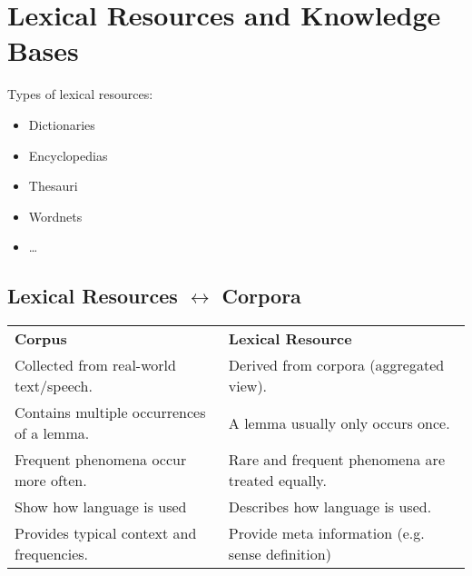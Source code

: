 \documentclass[a4paper, 11pt, accentcolor = tud3b]{tudreport}
\begin{document}
        \section{Lexical Resources and Knowledge Bases} %
        	Types of lexical resources:
        	\begin{itemize}
        		\item Dictionaries
        		\item Encyclopedias
        		\item Thesauri
        		\item Wordnets
        		\item \dots
        	\end{itemize}

            \subsection{Lexical Resources \( \leftrightarrow \) Corpora} %
                \begin{table}[H]
                	\centering
                	\begin{tabular}{l l}
                		\textbf{Corpus}                           & \textbf{Lexical Resource}                        \\
                		Collected from real-world text/speech.    & Derived from corpora (aggregated view).          \\
                		Contains multiple occurrences of a lemma. & A lemma usually only occurs once.                \\
                		Frequent phenomena occur more often.      & Rare and frequent phenomena are treated equally. \\
                		Show how language is used                 & Describes how language is used.                  \\
                		Provides typical context and frequencies. & Provide meta information (e.g. sense definition)
                	\end{tabular}
                \end{table}
\end{document}

